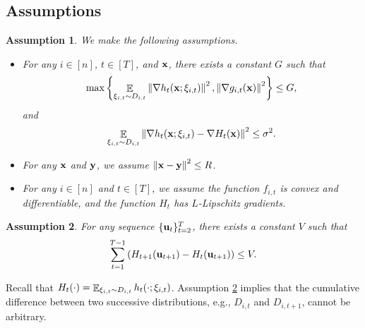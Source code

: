 \documentclass{article}
\newtheorem{Assumption}{\bf{Assumption}}
\begin{document}
\subsection{Assumptions}
\begin{Assumption}
\label{assumption_bounded_gradient_domain}
We make the following assumptions.
\begin{itemize}
\item For any $i\in[n]$, $t\in[T]$, and ${\bf x}$, there exists a constant $G$ such that
\begin{align}
\nonumber
\max\left\{ \mathop{\mathbb{E}}_{ \xi_{i,t} \sim D_{i,t} }\left\lVert\nabla h_t({\bf x};\xi_{i,t})\right\rVert^2,  \left\lVert\nabla g_{i,t}({\bf x})\right\rVert^2 \right\} \le G,
\end{align} and 
\begin{align}
\nonumber
\mathop{\mathbb{E}}_{ \xi_{i,t} \sim D_{i,t} } \left\lVert\nabla h_t({\bf x}; \xi_{i,t}) - \nabla H_t({\bf x})\right\rVert^2 \le \sigma^2.
\end{align}
\item For any ${\bf x}$ and ${\bf y}$, we assume $\left\lVert{\bf x}-{\bf y}\right\rVert^2 \le R$.
\item For any $i\in[n]$ and $t\in[T]$, we assume the function $f_{i,t}$ is convex and differentiable, and the function $H_t$ has  $L$-Lipschitz gradients.
\end{itemize}
\end{Assumption}

\begin{Assumption}
\label{assumption_difference_bound_distributions}
For any sequence $\{{\bf u}_t\}_{t=2}^{T}$, there exists a constant $V$ such that
\begin{align}
\nonumber
\sum_{t=1}^{T-1} \left(  H_{t+1}({\bf u}_{t+1}) - H_t({\bf u}_{t+1})  \right) \le V.
\end{align}
\end{Assumption}

Recall that  $ H_t(\cdot) = \mathop{\mathbb{E}}_{\xi_{i,t} \sim D_{i,t}} h_t(\cdot; \xi_{i,t})$.
Assumption \ref{assumption_difference_bound_distributions} implies that the cumulative difference between two successive distributions, e.g., $D_{i,t}$ and $D_{i,t+1}$, cannot be arbitrary.  
\end{document}

